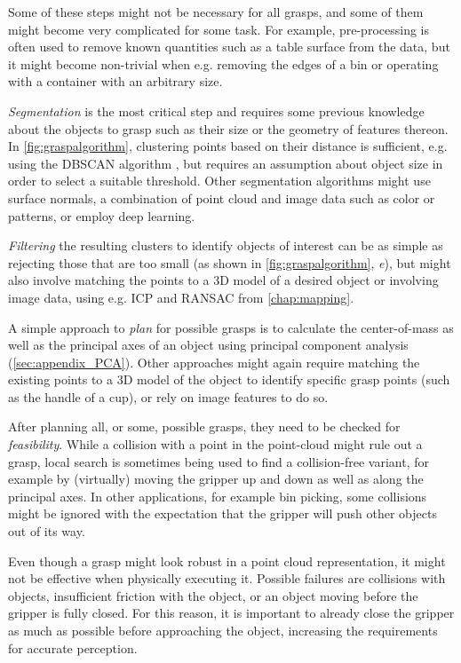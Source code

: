 Some of these steps might not be necessary for all grasps, and some of them might become very complicated for some task. For example, pre-processing is often used to remove known quantities such as a table surface from the data, but it might become non-trivial when e.g. removing the edges of a bin or operating with a container with an arbitrary size.

\textsl{Segmentation} is the most critical step and requires some previous knowledge about the objects to grasp such as their size or the geometry of features thereon. In \cref{fig:graspalgorithm}, clustering points based on their distance is sufficient, e.g. using the DBSCAN algorithm \cite{ester1996density}, but requires an assumption about object size in order to select a suitable threshold. Other segmentation algorithms might use surface normals, a combination of point cloud and image data such as color or patterns, or employ deep learning.

\textsl{Filtering} the resulting clusters to identify objects of interest can be as simple as rejecting those that are too small (as shown in \cref{fig:graspalgorithm}, \textsl{e}), but might also involve matching the points to a 3D model of a desired object or involving image data, using e.g. ICP and RANSAC from \cref{chap:mapping}.

A simple approach to \textsl{plan} for possible grasps is to calculate the center-of-mass as well as the principal axes of an object using principal component analysis (\cref{sec:appendix_PCA}). Other approaches might again require matching the existing points to a 3D model of the object to identify specific grasp points (such as the handle of a cup), or rely on image features to do so.

After planning all, or some, possible grasps, they need to be checked for \textsl{feasibility}. While a collision with a point in the point-cloud might rule out a grasp, local search is sometimes being used to find a collision-free variant, for example by (virtually) moving the gripper up and down as well as along the principal axes. In other applications, for example bin picking, some collisions might be ignored with the expectation that the gripper will push other objects out of its way.

Even though a grasp might look robust in a point cloud representation, it might not be effective when physically executing it. Possible failures are collisions with objects, insufficient friction with the object, or an object moving before the gripper is fully closed. For this reason, it is important to already close the gripper as much as possible before approaching the object, increasing the requirements for accurate perception.

